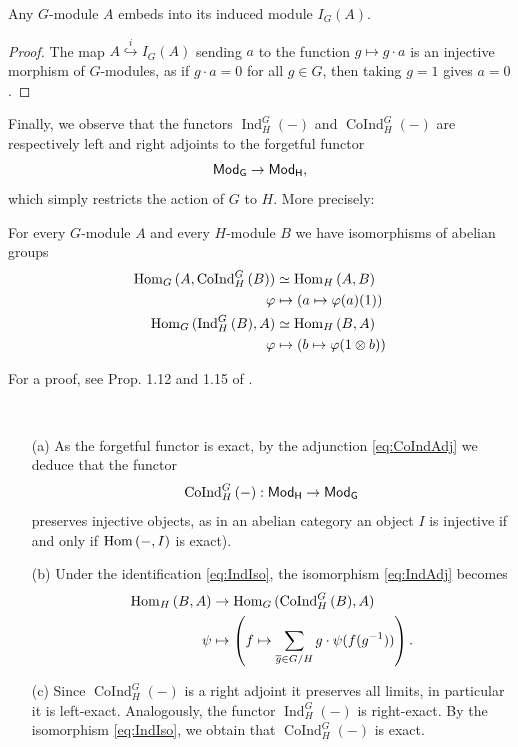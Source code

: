 \documentclass[a4paper, oneside]{memoir}
\begin{document}
\begin{proposition}
	Any $G$-module $A$ embeds into its induced module $I_G(A)$.
\end{proposition}

\begin{proof}
	The map $A\overset{i}{\hookrightarrow} I_G(A)$ sending $a$ to the function $g\mapsto g\cdot a$ is an injective morphism of $G$-modules, as if $g\cdot a = 0 $ for all $g\in G$, then taking $g=1$ gives $a=0$.
\end{proof}

\noindent Finally, we observe that the functors $\operatorname{Ind}^G_H{(-)}$ and $\operatorname{CoInd}^G_H{(-)}$ are respectively left and right adjoints to the forgetful functor
\[
	\mathsf{Mod}_\mathsf{G}\to\mathsf{Mod}_\mathsf{H},
\]
which simply restricts the action of $G$ to $H$. More precisely:

\begin{proposition}
	For every $G$-module $A$ and every $H$-module $B$ we have isomorphisms of abelian groups
	\begin{align}
		\operatorname{Hom}_G{(A,\operatorname{CoInd}^G_H{(B)})} & \simeq \operatorname{Hom}_H{(A,B)}\label{eq:CoIndAdj}                    \\
		\varphi                                   & \mapsto (a\mapsto \varphi(a)(1)) \nonumber                 \\
		\operatorname{Hom}_G{(\operatorname{Ind}^G_H{(B)},A)}   & \simeq \operatorname{Hom}_H{(B,A)}\label{eq:IndAdj}                      \\
		\varphi                                   & \mapsto \left(b\mapsto \varphi(1\otimes b)\right)\nonumber
	\end{align}
\end{proposition}
\noindent For a proof, see Prop. 1.12 and 1.15 of \cite{Harari}.

\begin{remark}\label{rm:Adj}\
	\begin{itemize}
		\item[(a)] As the forgetful functor is exact, by the adjunction \eqref{eq:CoIndAdj} we deduce that the functor
		      \[
			      \operatorname{CoInd}^G_H{(-)}:\mathsf{Mod}_\mathsf{H}\to\mathsf{Mod}_\mathsf{G}
		      \]
		      preserves injective objects, as in an abelian category an object $I$ is injective if and only if $\operatorname{Hom}{(-,I)}$ is exact).
		\item[(b)] Under the identification \eqref{eq:IndIso}, the isomorphism \eqref{eq:IndAdj} becomes
		      \begin{align*}
			      \operatorname{Hom}_H{(B,A)} & \to \operatorname{Hom}_G{(\operatorname{CoInd}^G_H{(B)},A)}                                        \\
			      \psi          & \mapsto \left(f\mapsto \sum_{\overline{g} \in G / H}{g\cdot \psi(f(g^{-1}))}\right).
		      \end{align*}
		\item[(c)] Since $\operatorname{CoInd}^G_H{(-)}$ is a right adjoint it preserves all limits, in particular it is left-exact. Analogously, the functor $\operatorname{Ind}^G_H{(-)}$ is right-exact. By the isomorphism \eqref{eq:IndIso}, we obtain that $\operatorname{CoInd}^G_H{(-)}$ is exact.
	\end{itemize}
\end{remark}
\end{document}

